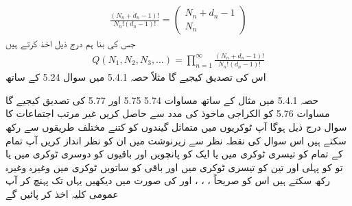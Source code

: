 \begin{align}
\frac{(N_n + d_n - 1) !}{N_n ! (d_n - 1) !} = 
\begin{pmatrix}
N_n + d_n - 1 \\
N_n
\end{pmatrix}
\end{align}
جس کی بنا ہم درج ذیل اخذ کرتے ہیں 
\begin{align}
Q(N_1 , N_2 , N_3 , \dotsc) = \prod_{n = 1}^{\infty} \frac{(N_n + d_n - 1) !}{N_n ! (d_n - 1) !}
\end{align}
اس کی تصدیق کیجیے گا مثلاً حصہ 5.4.1 میں سوال 5.24 کے ساتھ 


حصہ 5.4.1 میں مثال کے ساتھ مساوات 5.74 5.75 اور 5.77 کی تصدیق کیجیے گا 
مساوات 5.76 کو الكراجى ماخوذ کی مدد سے حاصل کریں غیر مرتب اجتماعات کا سوال درج ذیل ہوگا آپ  ٹوکریوں میں  متماثل گیندوں کو کتنے مختلف طریقوں سے رکھ سکتے ہیں اس سوال کی نقطہ نظر سے زیرنوشت میں ان کو نظر انداز کریں آپ تمام کے تمام  کو تیسری ٹوکری میں یا ایک کو پانچویں اور باقیوں کو دوسری ٹوکری میں یا تو کو پہلی اور تین کو تیسری ٹوکری میں اور باقی کو ساتویں ٹوکری میں وغیرہ وغیرہ رکھ سکتے ہیں اس کو صریحاً ،  ،  ،  اور  کی صورت میں دیکھیں یہاں تک پہنچ کر آپ عمومی کلیہ اخذ کر پائیں گے 

